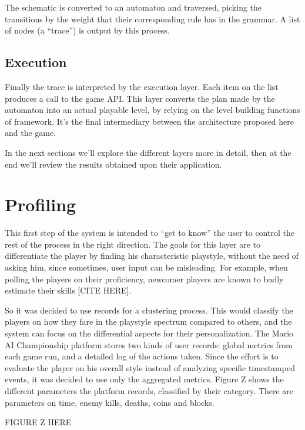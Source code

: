 \documentclass[conference]{IEEEtran}
\begin{document}
The schematic is converted to an automaton and traversed, picking the transitions by the weight that their corresponding rule has in the grammar. A list of nodes (a ``trace'') is output by this process.

\subsection{Execution}

Finally the trace is interpreted by the execution layer. Each item on the list produces a call to the game API. This layer converts the plan made by the automaton into an actual playable level, by relying on the level building functions of framework. It's the final intermediary between the architecture proposed here and the game.

In the next sections we'll explore the different layers more in detail, then at the end we'll review the results obtained upon their application.





\section{Profiling}

This first step of the system is intended to ``get to know'' the user to control the rest of the process in the right direction. The goals for this layer are to differentiate the player by finding his characteristic playstyle, without the need of asking him, since sometimes, user input can be misleading. For example, when polling the players on their proficiency, newcomer players are known to badly estimate their skills [CITE HERE].

So it was decided to use records for a clustering process. This would classify the players on how they fare in the playstyle spectrum compared to others, and the system can focus on the differential aspects for their personalization. The Mario AI Championship platform stores two kinds of user records: global metrics from each game run, and a detailed log of the actions taken. Since the effort is to evaluate the player on his overall style instead of analyzing specific timestamped events, it was decided to use only the aggregated metrics. Figure Z shows the different parameters the platform records, classified by their category. There are parameters on time, enemy kills, deaths, coins and blocks.

FIGURE Z HERE
\end{document}
